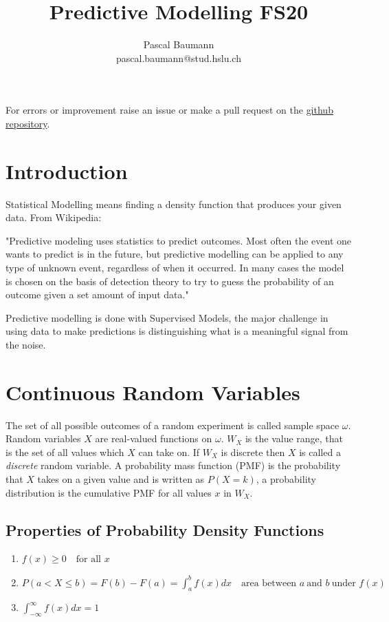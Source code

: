 \documentclass[11pt]{article}
\theoremstyle{definition}
\begin{document}
	
\title{Predictive Modelling FS20}
\author{Pascal Baumann\\pascal.baumann@stud.hslu.ch}
\maketitle



For errors or improvement raise an issue or make a pull request on the \href{https://github.com/KilnOfTheSecondFlame/mse_summaries}{github repository}.

\tableofcontents
\newpage



\section{Introduction}
Statistical Modelling means finding a density function that produces your given data. From Wikipedia:

"Predictive modeling uses statistics to predict outcomes. Most often the event one wants to predict is in the future, but predictive modelling can be applied to any type of unknown event, regardless of when it occurred. In many cases the model is chosen on the basis of detection theory to try to guess the probability of an outcome given a set amount of input data."

Predictive modelling is done with Supervised Models, the major challenge in using data to make predictions is distinguishing what is a meaningful signal from the noise.

\section{Continuous Random Variables}
The set of all possible outcomes of a random experiment is called sample space $\omega$. Random variables $X$ are real-valued functions on $\omega$. $W_X$ is the value range, that is the set of all values which $X$ can take on. If $W_X$ is discrete then $X$ is called a \emph{discrete} random variable. A probability mass function (PMF) is the probability that $X$ takes on a given value and is written as $P(X=k)$, a probability distribution is the cumulative PMF for all values $x$ in $W_X$.

\subsection{Properties of Probability Density Functions}
\begin{enumerate}
	\item $f(x) \geq 0\quad \text{for all }x$
	\item $P(a<X\leq b) = F(b) - F(a) = \int_{a}^{b}f(x) dx\quad \text{area between }a\ \text{and }b\ \text{under }f(x)$
	\item $ \int_{-\infty}^{\infty}f(x) dx = 1$
\end{enumerate}
\end{document}
